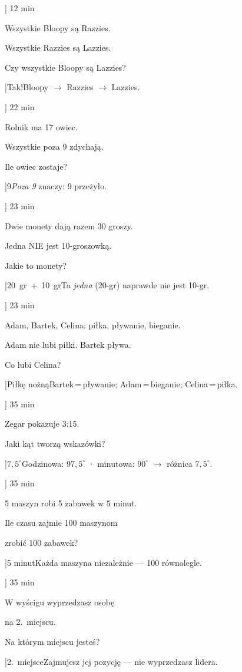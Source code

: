 
\ExerciseSlide[\CategoryBadge[LogicColor!20]{Sylogizm}]
  {1}{2 min}{%
    Wszystkie Bloopy są Razzies.\par
    Wszystkie Razzies są Lazzies.\par
    Czy wszystkie Bloopy są Lazzies?
  }
\AnswerSlide[\CategoryBadge[LogicColor!20]{Sylogizm}]{Tak!}{Bloopy $\to$ Razzies $\to$ Lazzies.}

\ExerciseSlide[\CategoryBadge[LogicColor!20]{Pu\l{}apka}]
  {2}{2 min}{%
    Rolnik ma 17 owiec.\par
    Wszystkie poza 9 zdychaj\k{a}.\par
    Ile owiec zostaje?
  }
\AnswerSlide[\CategoryBadge[LogicColor!20]{Pu\l{}apka}]{9}{\emph{Poza 9} znaczy: 9 prze\. zy\l{}o.}

\ExerciseSlide[\CategoryBadge[LogicColor!20]{Pu\l{}apka}]
  {2}{3 min}{%
    Dwie monety daj\k{a} razem 30 groszy.\par
    Jedna NIE jest 10-groszowk\k{a}.\par
    Jakie to monety?
  }
\AnswerSlide[\CategoryBadge[LogicColor!20]{Pu\l{}apka}]{20~gr~+~10~gr}{Ta \emph{jedna} (20-gr) naprawde nie jest 10-gr.}

\ExerciseSlide[\CategoryBadge[LogicColor!20]{Dedukcja}]
  {2}{3 min}{%
    Adam, Bartek, Celina: pi\l{}ka, p\l{}ywanie, bieganie.\par
    Adam nie lubi pi\l{}ki. Bartek p\l{}ywa.\par
    Co lubi Celina?
  }
\AnswerSlide[\CategoryBadge[LogicColor!20]{Dedukcja}]{Pi\l{}k\k{e} no\. zn\k{a}}{Bartek\,=\,p\l{}ywanie; Adam\,=\,bieganie; Celina\,=\,pi\l{}ka.}

\ExerciseSlide[\CategoryBadge[LogicColor!20]{Geometria}]
  {3}{5 min}{%
    Zegar pokazuje 3:15.\par
    Jaki k\k{a}t tworz\k{a} wskaz\'{o}wki?
  }
\AnswerSlide[\CategoryBadge[LogicColor!20]{Geometria}]{$7{,}5^\circ$}{Godzinowa: $97{,}5^\circ$ · minutowa: $90^\circ$ $\to$ r\'{o}\. znica $7{,}5^\circ$.}

\ExerciseSlide[\CategoryBadge[LogicColor!20]{Pu\l{}apka}]
  {3}{5 min}{%
    5 maszyn robi 5 zabawek w 5 minut.\par
    Ile czasu zajmie 100 maszynom\par
    zrobi\'c 100 zabawek?
  }
\AnswerSlide[\CategoryBadge[LogicColor!20]{Pu\l{}apka}]{5 minut}{Ka\. zda maszyna niezale\. znie --- 100 r\'{o}wnolegle.}

\ExerciseSlide[\CategoryBadge[LogicColor!20]{Pu\l{}apka}]
  {3}{5 min}{%
    W wy\'scigu wyprzedzasz osob\k{e}\par
    na 2.~miejscu.\par
    Na kt\'{o}rym miejscu jeste\'s?
  }
\AnswerSlide[\CategoryBadge[LogicColor!20]{Pu\l{}apka}]{2.~miejsce}{Zajmujesz jej pozycj\k{e} --- nie wyprzedzasz lidera.}
